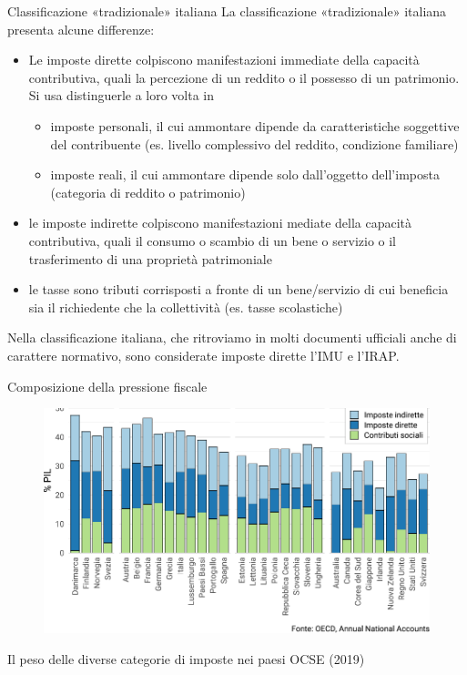 \documentclass[11pt]{beamer}
\begin{document}
\begin{frame}{Classificazione «tradizionale» italiana}
La classificazione «tradizionale» italiana presenta alcune differenze:
\begin{itemize}
\item Le \alert{imposte dirette} colpiscono manifestazioni immediate della capacità
contributiva, quali la percezione di un reddito o il possesso di un
patrimonio. Si usa distinguerle a loro volta in
\begin{itemize}
\item imposte \alert{personali}, il cui ammontare dipende da caratteristiche
soggettive del contribuente (es. livello complessivo del reddito,
condizione familiare)
\item imposte \alert{reali}, il cui ammontare dipende solo dall'oggetto dell'imposta
(categoria di reddito o patrimonio)
\end{itemize}
\item le \alert{imposte indirette} colpiscono manifestazioni mediate della capacità
contributiva, quali il consumo o scambio di un bene o servizio o il
trasferimento di una proprietà patrimoniale
\item le \alert{tasse} sono tributi corrisposti a fronte di un bene/servizio di cui
beneficia sia il richiedente che la collettività (es. tasse scolastiche)
\end{itemize}

\begin{block}{}
Nella classificazione italiana, che ritroviamo in molti documenti ufficiali anche di carattere normativo, sono considerate imposte dirette l'IMU e l'IRAP.
\end{block}
\end{frame}

\begin{frame}{Composizione della pressione fiscale}
\begin{figure}[htbp]
\centering
\includegraphics[width=\textwidth]{./figure/classificazione-imposte-oecd-color.pdf}
\end{figure}

\vspace{-3mm}
Il peso delle diverse categorie di imposte nei paesi OCSE (2019)
\end{frame}
\end{document}
